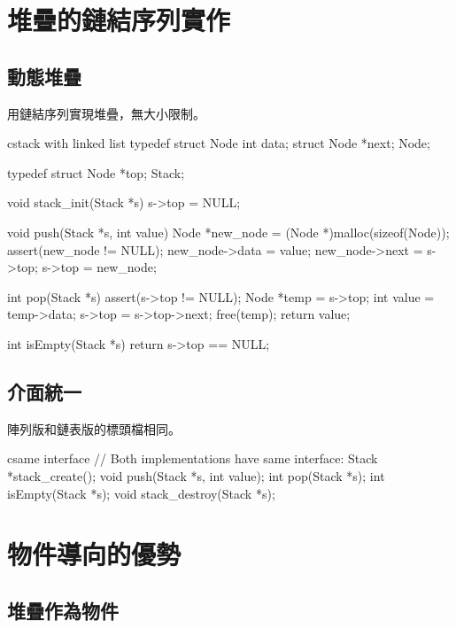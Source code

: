 
\section{堆疊的鏈結序列實作}

\subsection*{動態堆疊}

用鏈結序列實現堆疊，無大小限制。

\begin{code}{c}{stack with linked list}
typedef struct Node {
    int data;
    struct Node *next;
} Node;

typedef struct {
    Node *top;
} Stack;

void stack_init(Stack *s) {
    s->top = NULL;
}

void push(Stack *s, int value) {
    Node *new_node = (Node *)malloc(sizeof(Node));
    assert(new_node != NULL);
    new_node->data = value;
    new_node->next = s->top;
    s->top = new_node;
}

int pop(Stack *s) {
    assert(s->top != NULL);
    Node *temp = s->top;
    int value = temp->data;
    s->top = s->top->next;
    free(temp);
    return value;
}

int isEmpty(Stack *s) {
    return s->top == NULL;
}
\end{code}

\subsection*{介面統一}

陣列版和鏈表版的標頭檔相同。

\begin{code}{c}{same interface}
// Both implementations have same interface:
Stack *stack_create();
void push(Stack *s, int value);
int pop(Stack *s);
int isEmpty(Stack *s);
void stack_destroy(Stack *s);
\end{code}


\section{物件導向的優勢}

\subsection*{堆疊作為物件}

